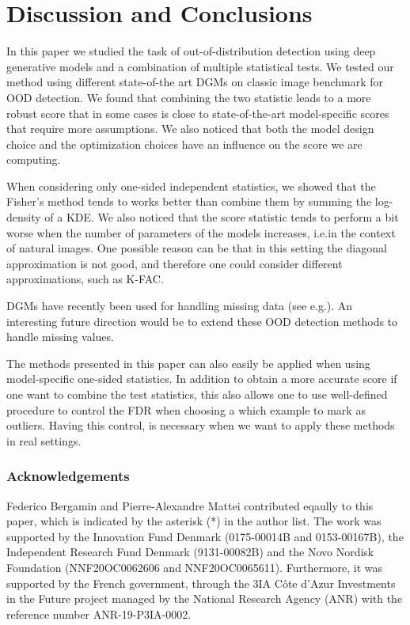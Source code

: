 {%
\section{Discussion and Conclusions}
In this paper we studied the task of out-of-distribution detection using deep generative models and a combination of multiple statistical tests. We tested our method using different state-of-the art DGMs on classic image benchmark for OOD detection. We found that combining the two statistic leads to a more robust score that in some cases is close to state-of-the-art model-specific scores that require more assumptions. We also noticed that both the model design choice and the optimization choices have an influence on the score we are computing. 

When considering only one-sided independent statistics, we showed that the Fisher's method tends to works better than combine them by summing the log-density of a KDE. We also noticed that the score statistic tends to perform a bit worse when the number of parameters of the models increases, i.e.\@ in the context of natural images. One possible reason can be that in this setting the diagonal approximation is not good, and therefore one could consider different approximations, such as K-FAC. 

DGMs have recently been used for handling missing data (see e.g.\@ \citealp{mattei_miwae_2019, ma_eddi_2019, nazabal_handling_2020, ipsen_not-miwae_2021}). An interesting future direction would be to extend these OOD detection methods to handle missing values.

The methods  presented in this paper can also easily be applied when using model-specific one-sided statistics. In addition to obtain a more accurate score if one want to combine the test statistics, this also allows one to use well-defined procedure to control the FDR when choosing a which example to mark as outliers. Having this control, is necessary when we want to apply these methods in real settings. 


\subsubsection*{Acknowledgements}
Federico Bergamin and Pierre-Alexandre Mattei contributed eqaully to this paper, which is indicated by the asterisk (*) in the author list. The work was supported by the Innovation Fund Denmark (0175-00014B and 0153-00167B), the Independent Research Fund Denmark (9131-00082B) and the Novo Nordisk Foundation (NNF20OC0062606 and NNF20OC0065611). Furthermore, it was supported by the French government, through the 3IA Côte d’Azur Investments in the Future project managed by the National Research Agency (ANR) with the reference number ANR-19-P3IA-0002.


}